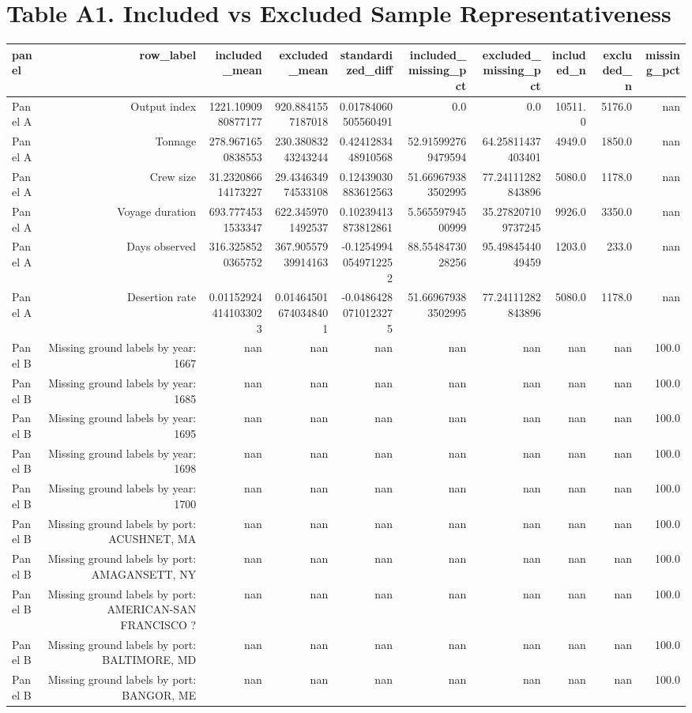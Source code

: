 \documentclass{article}
\begin{document}
\section*{Table A1. Included vs Excluded Sample Representativeness}
\begin{tabular}{lrrrrrrrrr}
\hline
panel & row_label & included_mean & excluded_mean & standardized_diff & included_missing_pct & excluded_missing_pct & included_n & excluded_n & missing_pct \\
\hline
Panel A & Output index & 1221.1090980877177 & 920.8841557187018 & 0.01784060505560491 & 0.0 & 0.0 & 10511.0 & 5176.0 & nan \\
Panel A & Tonnage & 278.9671650838553 & 230.38083243243244 & 0.4241283448910568 & 52.915992769479594 & 64.25811437403401 & 4949.0 & 1850.0 & nan \\
Panel A & Crew size & 31.232086614173227 & 29.434634974533108 & 0.12439030883612563 & 51.669679383502995 & 77.24111282843896 & 5080.0 & 1178.0 & nan \\
Panel A & Voyage duration & 693.7774531533347 & 622.3459701492537 & 0.10239413873812861 & 5.56559794500999 & 35.278207109737245 & 9926.0 & 3350.0 & nan \\
Panel A & Days observed & 316.3258520365752 & 367.90557939914163 & -0.12549940549712252 & 88.5548473028256 & 95.4984544049459 & 1203.0 & 233.0 & nan \\
Panel A & Desertion rate & 0.011529244141033023 & 0.014645016740348401 & -0.04864280710123275 & 51.669679383502995 & 77.24111282843896 & 5080.0 & 1178.0 & nan \\
Panel B & Missing ground labels by year: 1667 & nan & nan & nan & nan & nan & nan & nan & 100.0 \\
Panel B & Missing ground labels by year: 1685 & nan & nan & nan & nan & nan & nan & nan & 100.0 \\
Panel B & Missing ground labels by year: 1695 & nan & nan & nan & nan & nan & nan & nan & 100.0 \\
Panel B & Missing ground labels by year: 1698 & nan & nan & nan & nan & nan & nan & nan & 100.0 \\
Panel B & Missing ground labels by year: 1700 & nan & nan & nan & nan & nan & nan & nan & 100.0 \\
Panel B & Missing ground labels by port: ACUSHNET, MA & nan & nan & nan & nan & nan & nan & nan & 100.0 \\
Panel B & Missing ground labels by port: AMAGANSETT, NY & nan & nan & nan & nan & nan & nan & nan & 100.0 \\
Panel B & Missing ground labels by port: AMERICAN-SAN FRANCISCO ? & nan & nan & nan & nan & nan & nan & nan & 100.0 \\
Panel B & Missing ground labels by port: BALTIMORE, MD & nan & nan & nan & nan & nan & nan & nan & 100.0 \\
Panel B & Missing ground labels by port: BANGOR, ME & nan & nan & nan & nan & nan & nan & nan & 100.0 \\
\hline
\end{tabular}
\end{document}
